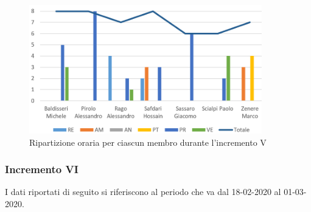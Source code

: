 \begin{figure}[!htb]   
    \centering
    \includegraphics[width=0.9\textwidth]{Images/inc5}
	\caption{Ripartizione oraria per ciascun membro durante l'incremento V}
\end{figure}

\subsubsection{Incremento VI}

I dati riportati di seguito si riferiscono al periodo che va dal 18-02-2020 al 01-03-2020.

